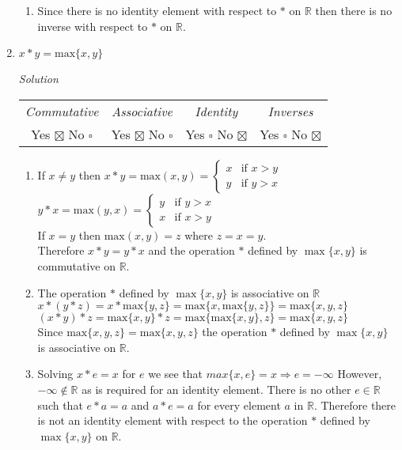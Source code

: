 \documentclass[12pt]{article}
\begin{document}
\begin{flushleft}
\begin{enumerate}
\begin{enumerate}
	\item Since there is no identity element with respect to $*$ on $\mathbb{R}$ then there is no inverse with respect to $*$ on $\mathbb{R}$.

	\end{enumerate}
	
	
\item $x * y = \text{max}\{x,y\}$

	\medskip
	\textit{Solution}
	\medskip
	
	\begin{tabular}{c c c c}
	\textit{Commutative} & \textit{Associative} & \textit{Identity} & \textit{Inverses} \\
	Yes $\boxtimes$ No $\square$ & Yes $\boxtimes$ No $\square$ & Yes $\square$ No $\boxtimes$ & Yes $\square$ No $\boxtimes$ \\
	\end{tabular}
		
	\begin{enumerate}
	\item If $x \neq y$ then $x * y = \text{max}(x,y) = \begin{cases} x &\mbox{if } x > y \\ y &\mbox{if } y > x \end{cases}$ \\
	 $y * x = \text{max}(y,x) = \begin{cases} y &\mbox{if } y > x \\ x &\mbox{if } x > y \end{cases}$ \\
	 If $x = y$ then $\text{max}(x,y) = z$ where $z = x = y$. \\
	 Therefore $x * y = y * x$ and the operation $*$ defined by $\max\{x,y\}$ is commutative on $\mathbb{R}$.
	 
	 \item The operation $*$ defined by $\max\{x,y\}$ is associative on $\mathbb{R}$ \\
	 $x * (y * z) = x * \text{max}\{y,z\} = \text{max}\{x, \text{max}\{y,z\}\} = \text{max}\{x, y, z\} $ \\
	 $(x * y) * z = \text{max}\{x,y\} * z = \text{max}\{\text{max}\{x,y\}, z \} = \text{max}\{x, y, z\}$ \\
	 Since $\text{max}\{x, y, z\} = \text{max}\{x, y, z\}$ the operation $*$ defined by $\max\{x,y\}$ is associative on $\mathbb{R}$.
	 
	 \item  Solving $x * e = x$ for $e$ we see that $max\{x, e\} = x \Rightarrow e = -\infty$
	 However, $-\infty \notin \mathbb{R}$ as is required for an identity element. There is no other $e \in \mathbb{R}$ such that $e * a = a$ and $a * e = a$ for every element $a$ in $\mathbb{R}$. Therefore there is not an identity element with respect to the operation $*$ defined by $\max\{x,y\}$ on $\mathbb{R}$.
	 

\end{enumerate}
\end{enumerate}
\end{flushleft}
\end{document}
